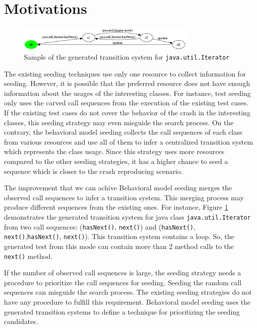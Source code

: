 \section{Motivations}
\begin{figure}[t]
    \centering
    \includegraphics[width=0.77\textwidth]{figures/motivation/sample.png}
    \caption{Sample of the generated transition system for \texttt{java.util.Iterator}}
    \label{fig:motivation}
\end{figure}
The existing seeding techniques use only one resource to collect information for seeding. However, it is possible that the preferred resource does not have enough information about the usages of the interesting classes. For instance, test seeding only uses the carved call sequences from the execution of the existing test cases. If the existing test cases do not cover the behavior of the crash in the interesting classes, this seeding strategy may even misguide the search process. On the contrary, the behavioral model seeding collects the call sequences of each class from various resources and use all of them to infer a centralized transition system which represents the class usage. Since this strategy uses more resources compared to the other seeding strategies, it has a higher chance to seed a sequence which is closer to the crash reproducing scenario.

The improvement that we can achive Behavioral model seeding merges the observed call sequences to infer a transition system. This merging process may produce different sequences from the existing ones. For instance, Figure \ref{fig:motivation} demonstrates the generated transition system for java class \texttt{java.util.Iterator} from two call sequences: (\texttt{hasNext()}, \texttt{next()}) and (\texttt{hasNext()}, \texttt{next()},\texttt{hasNext()}, \texttt{next()}). This transition system contains a loop. So, the generated test from this mode can contain more than 2 method calls to the \texttt{next()} method.


If the number of observed call sequences is large, the seeding strategy needs a procedure to prioritize the call sequences for seeding. Seeding the random call sequences can misguide the search process. The existing seeding strategies do not have any procedure to fulfill this requirement. Behavioral model seeding uses the generated transition systems to define a technique for prioritizing the seeding candidates.
